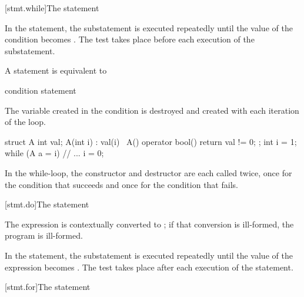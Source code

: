 [stmt.while]{The  statement}%

\pnum
In the  statement, the substatement is executed repeatedly
until the value of the condition becomes
. The test takes place before each execution of the
substatement.

\pnum
{}%
A  statement is equivalent to
\begin{ncsimplebnf}
 \terminal{:}\br
\terminal{\{}\br
\bnfindent {} \terminal{(} condition \terminal{)} \terminal{\{}\br
\bnfindent \bnfindent statement\br
\bnfindent \bnfindent {}  \terminal{;}\br
\bnfindent \terminal{\}}\br
\terminal{\}}
\end{ncsimplebnf}
\begin{note}
The variable created in the condition is destroyed and created with each
iteration of the loop.
\begin{example}
\begin{codeblock}
struct A {
  int val;
  A(int i) : val(i) { }
  ~A() { }
  operator bool() { return val != 0; }
};
int i = 1;
while (A a = i) {
  // ...
  i = 0;
}
\end{codeblock}
In the while-loop, the constructor and destructor are each called twice,
once for the condition that succeeds and once for the condition that
fails.
\end{example}
\end{note}

[stmt.do]{The  statement}%

\pnum
The expression is contextually converted to ;
if that conversion is ill-formed, the program is ill-formed.

\pnum
In the  statement, the substatement is executed repeatedly
until the value of the expression becomes . The test takes
place after each execution of the statement.

[stmt.for]{The  statement}%

